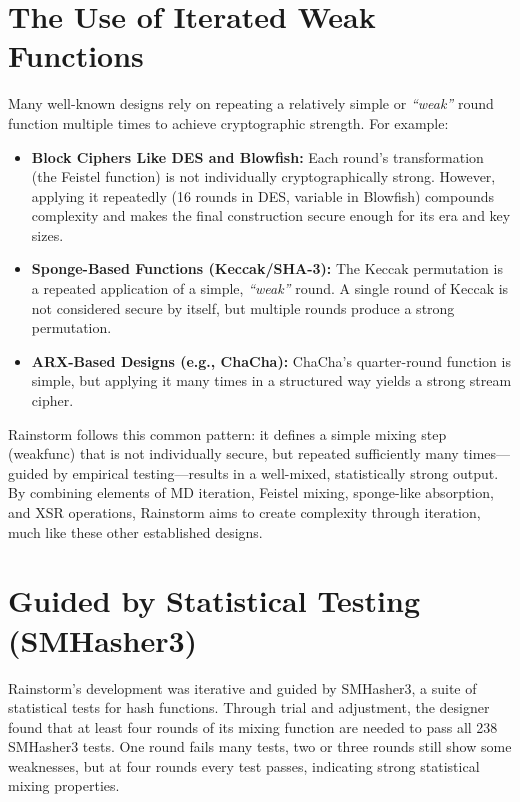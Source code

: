 \documentclass[11pt,a4paper]{article}
\begin{document}
\section*{The Use of Iterated Weak Functions}

Many well-known designs rely on repeating a relatively simple or \textit{``weak''} round function multiple times to achieve cryptographic strength. For example:

\begin{itemize}
  \item \textbf{Block Ciphers Like DES and Blowfish:} Each round's transformation (the Feistel function) is not individually cryptographically strong. However, applying it repeatedly (16 rounds in DES, variable in Blowfish) compounds complexity and makes the final construction secure enough for its era and key sizes.
  
  \item \textbf{Sponge-Based Functions (Keccak/SHA-3):} The Keccak permutation is a repeated application of a simple, \textit{``weak''} round. A single round of Keccak is not considered secure by itself, but multiple rounds produce a strong permutation.
  
  \item \textbf{ARX-Based Designs (e.g., ChaCha):} ChaCha's quarter-round function is simple, but applying it many times in a structured way yields a strong stream cipher.
\end{itemize}

Rainstorm follows this common pattern: it defines a simple mixing step (weakfunc) that is not individually secure, but repeated sufficiently many times—guided by empirical testing—results in a well-mixed, statistically strong output. By combining elements of MD iteration, Feistel mixing, sponge-like absorption, and XSR operations, Rainstorm aims to create complexity through iteration, much like these other established designs.

\section*{Guided by Statistical Testing (SMHasher3)}
Rainstorm’s development was iterative and guided by SMHasher3, a suite of statistical tests for hash functions. Through trial and adjustment, the designer found that at least four rounds of its mixing function are needed to pass all 238 SMHasher3 tests. One round fails many tests, two or three rounds still show some weaknesses, but at four rounds every test passes, indicating strong statistical mixing properties.
\end{document}
